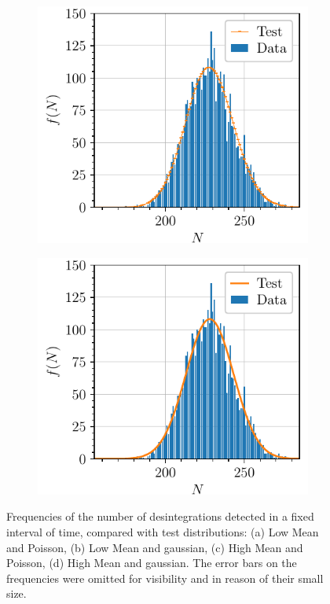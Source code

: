 \begin{figure}[htbp]
\begin{subfigure}{0.495\textwidth}
        \includegraphics[scale=1]{figures/highmean_poisson.pdf}
        \caption{}
    \end{subfigure}
    \hfill
    \begin{subfigure}{0.495\textwidth}
        \includegraphics[scale=1]{figures/highmean_gaussian.pdf}
        \caption{}
    \end{subfigure}
    \caption{Frequencies of the number of desintegrations detected 
    in a fixed interval of time, compared with test distributions: 
    (a) Low Mean and Poisson, (b) Low Mean and gaussian, 
    (c) High Mean and Poisson, (d) High Mean and gaussian.
    The error bars on the frequencies were omitted for visibility and in reason of their small size.}
    \label{fig:statistical_tests}
\end{figure}

